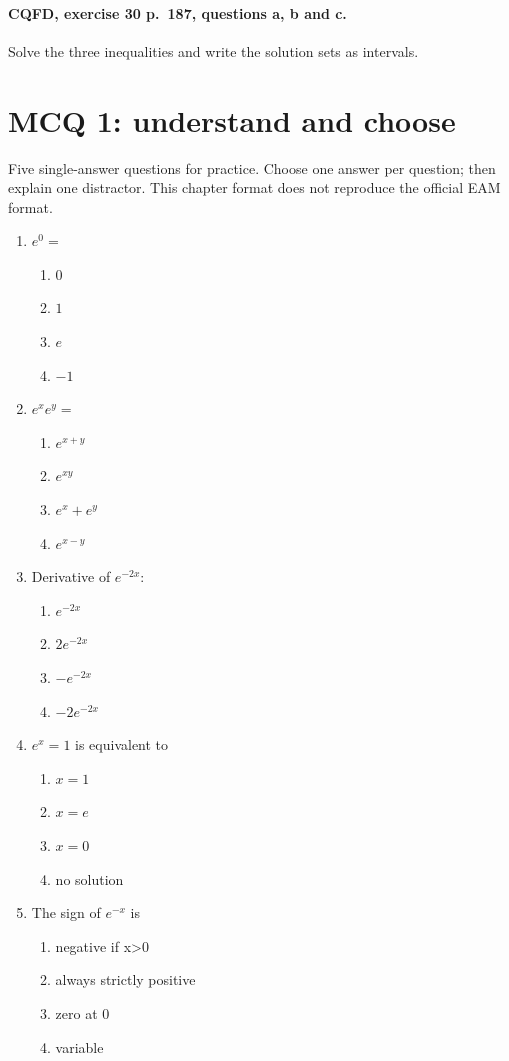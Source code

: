 \paragraph{CQFD, exercise 30 p.~187, questions a, b and c.}\label{C09-M2} Solve the three inequalities and write the solution sets as intervals.
\begingroup\small
\clearpage\section*{MCQ 1: understand and choose}\label{C09-Q1}
Five single-answer questions for practice. Choose one answer per question; then explain one distractor. This chapter format does not reproduce the official EAM format.
\begin{enumerate}
\item $e^0=$
\begin{enumerate}[label=\Alph*.,itemsep=2pt]
\item $0$
\item $1$
\item $e$
\item $-1$
\end{enumerate}
\item $e^xe^y=$
\begin{enumerate}[label=\Alph*.,itemsep=2pt]
\item $e^{x+y}$
\item $e^{xy}$
\item $e^x+e^y$
\item $e^{x-y}$
\end{enumerate}
\item Derivative of $e^{-2x}$:
\begin{enumerate}[label=\Alph*.,itemsep=2pt]
\item $e^{-2x}$
\item $2e^{-2x}$
\item $-e^{-2x}$
\item $-2e^{-2x}$
\end{enumerate}
\item $e^x=1$ is equivalent to
\begin{enumerate}[label=\Alph*.,itemsep=2pt]
\item $x=1$
\item $x=e$
\item $x=0$
\item no solution
\end{enumerate}
\item The sign of $e^{-x}$ is
\begin{enumerate}[label=\Alph*.,itemsep=2pt]
\item negative if x>0
\item always strictly positive
\item zero at 0
\item variable
\end{enumerate}
\end{enumerate}
